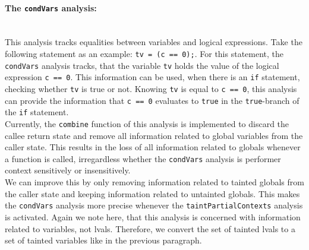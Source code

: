       \paragraph{The \texttt{condVars} analysis:}\mbox{}\\
        This analysis tracks equalities between variables and logical expressions. Take the following statement as an example: \texttt{tv = (c == 0);}. For this statement, the \texttt{condVars} analysis tracks, that the variable \texttt{tv} holds the value of the logical expression \texttt{c == 0}. This information can be used, when there is an \texttt{if} statement, checking whether \texttt{tv} is true or not. Knowing \texttt{tv} is equal to \texttt{c == 0}, this analysis can provide the information that \texttt{c == 0} evaluates to \texttt{true} in the \texttt{true}-branch of the \texttt{if} statement.\\
        Currently, the \texttt{combine} function of this analysis is implemented to discard the callee return state and remove all information related to global variables from the caller state. This results in the loss of all information related to globals whenever a function is called, irregardless whether the \texttt{condVars} analysis is performer context sensitively or insensitively.\\
        We can improve this by only removing information related to tainted globals from the caller state and keeping information related to untainted globals. This makes the \texttt{condVars} analysis more precise whenever the \texttt{taintPartialContexts} analysis is activated. Again we note here, that this analysis is concerned with information related to variables, not \ac{lval}s. Therefore, we convert the set of tainted \ac{lval}s to a set of tainted variables like in the previous paragraph. 
      